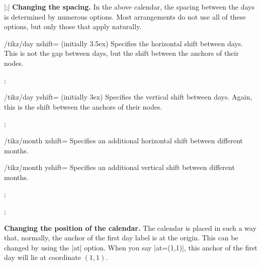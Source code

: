 \begin{command}{\calendar {}|;|}
    \medskip
    \textbf{Changing the spacing.}
    In the above calendar, the spacing between the days is determined by
    numerous options. Most arrangements do not use all of these options, but
    only those that apply naturally.
    \begin{key}{/tikz/day xshift= (initially 3.5ex)}
        Specifies the horizontal shift between days. This is not the gap
        between days, but the shift between the anchors of their nodes.
\begin{codeexample}[]
\tikz \calendar[dates=2000-01-01 to 2000-01-31,week list,day xshift=3ex];
\end{codeexample}
    \end{key}
    \begin{key}{/tikz/day yshift= (initially 3ex)}
        Specifies the vertical shift between days. Again, this is the shift
        between the anchors of their nodes.
\begin{codeexample}[]
\tikz \calendar[dates=2000-01-01 to 2000-01-31,week list,day yshift=2ex];
\end{codeexample}
    \end{key}
    \begin{key}{/tikz/month xshift=}
        Specifies an additional  horizontal shift between different months.
    \end{key}
    \begin{key}{/tikz/month yshift=}
        Specifies an additional  vertical shift between different months.
\begin{codeexample}[]
\tikz \calendar[dates=2000-01-01 to 2000-02-last,week list,
                month yshift=0pt];
\end{codeexample}
\begin{codeexample}[]
\tikz \calendar[dates=2000-01-01 to 2000-02-last,week list,
                month yshift=1cm];
\end{codeexample}
    \end{key}


    \medskip
    \textbf{Changing the position of the calendar.}
    The calendar is placed in such a way that, normally, the anchor of the
    first day label is at the origin. This can be changed by using the |at|
    option. When you say |at={(1,1)}|, this anchor of the first day will lie at
    coordinate $(1,1)$.


\end{command}
